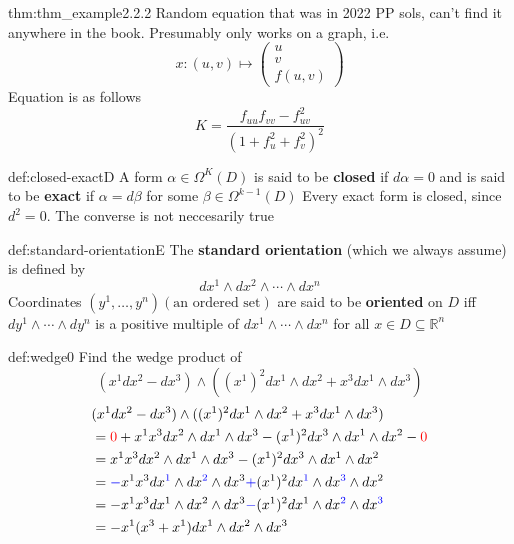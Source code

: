\documentclass[landscape, 8pt]{extarticle}
\begin{document}
\begin{multicols}{3}
\begin{thm}{thm:thm_example}{2.2.2}
Random equation that was in 2022 PP sols, can't find it anywhere in the book. Presumably only works on a graph, i.e.
\[x : (u,v) \mapsto \begin{pmatrix}
    u \\
    v \\
    f(u,v)
\end{pmatrix}\]
Equation is as follows
\[K = \frac{f_{uu} f_{vv} - f_{uv}^{2}}{(1 + f^{2}_{u} + f^{2}_{v})^{2}}\]
\end{thm}
\vspace{-5pt}

\begin{dfn}{def:closed-exact}{D}
A form \(\alpha\in \Omega^{K}(D)\) is said to be \textbf{closed} if \(d\alpha = 0\) and is said to be \textbf{exact} if \(\alpha = d\beta\) for some \(\beta\in \Omega^{k-1}(D)\)\newline
Every exact form is closed, since \(d^{2} = 0\). The converse is not neccesarily true
\end{dfn}

\begin{dfn}{def:standard-orientation}{E}
The \textbf{standard orientation} (which we always assume) is defined by
\[dx^{1} \wedge dx^{2}\wedge \cdots \wedge dx^{n}\]
Coordinates \((y^{1},\dots,y^{n})(\text{an ordered set})\) are said to be \textbf{oriented} on \(D\) iff \(dy^{1}\wedge \cdots \wedge dy^{n}\) is a positive multiple of \(dx^{1}\wedge \cdots \wedge dx^{n}\) for all \(x\in D \subseteq \mathbb{R}^{n}\)
\end{dfn}

\begin{xmp}{def:wedge}{0}
Find the wedge product of 
\[(x^{1}dx^{2} - dx^{3}) \wedge ((x^{1})^{2}dx^{1}\wedge dx^{2} + x^{3}dx^{1}\wedge dx^{3})\]
\begin{align*}
   &(x^{1}dx^{2} - dx^{3}) \wedge ((x^{1})^{2}dx^{1}\wedge dx^{2} + x^{3}dx^{1}\wedge dx^{3}) \\
    &= \textcolor{red}{0} + x^{1}x^{3}dx^{2}\wedge dx^{1}\wedge dx^{3} - (x^{1})^{2}dx^{3}\wedge dx^{1}\wedge dx^{2} - \textcolor{red}{0} \\
    &= x^{1}x^{3}dx^{2}\wedge dx^{1}\wedge dx^{3} - (x^{1})^{2}dx^{3}\wedge dx^{1}\wedge dx^{2} \\
    &= \textcolor{blue}{-}x^{1}x^{3}dx^{\textcolor{blue}{1}}\wedge dx^{\textcolor{blue}{2}}\wedge dx^{3} \textcolor{blue}{+} (x^{1})^{2}dx^{\textcolor{blue}{1}}\wedge dx^{\textcolor{blue}{3}}\wedge dx^{2} \\
    &= -x^{1}x^{3}dx^{1}\wedge dx^{2}\wedge dx^{3} \textcolor{blue}{-} (x^{1})^{2}dx^{1}\wedge dx^{\textcolor{blue}{2}}\wedge dx^{\textcolor{blue}{3}} \\
    &= -x^{1}(x^{3} + x^{1} )dx^{1}\wedge dx^{2}\wedge dx^{3}
\end{align*}
\end{xmp}



\end{multicols}
\end{document}
